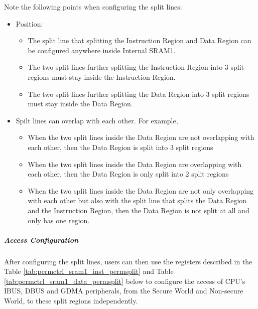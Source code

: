 \documentclass[main\_\_EN.tex]{subfiles}
\begin{document}
Note the following points when configuring the split lines:

 \begin{itemize}
     \item Position:
     \begin{itemize}
         \item The split line that splitting the Instruction Region and Data Region can be configured anywhere inside Internal SRAM1.
         \item The two split lines further splitting the Instruction Region into 3 split regions must stay inside the Instruction Region.
         \item The two split lines further splitting the Data Region into 3 split regions must stay inside the Data Region.
     \end{itemize}
     \item Spilt lines can overlap with each other. For example,
     \begin{itemize}
         \item When the two split lines inside the Data Region are not overlapping with each other, then the Data Region is split into 3 split regions
         \item When the two split lines inside the Data Region are overlapping with each other, then the Data Region is only split into 2 split regions
         \item When the two split lines inside the Data Region are not only overlapping with each other but also with the split line that splits the Data Region and the Instruction Region, then the Data Region is not split at all and only has one region.
     \end{itemize}
     \end{itemize}

\subparagraph{Access Configuration}

After configuring the split lines, users can then use the registers described in the Table \ref{tab:permctrl_sram1_inst_permsplit} and Table \ref{tab:permctrl_sram1_data_permsplit} below to configure the access of CPU's IBUS, DBUS and GDMA peripherals, from the Secure World and Non-secure World, to these split regions independently.
\end{document}

